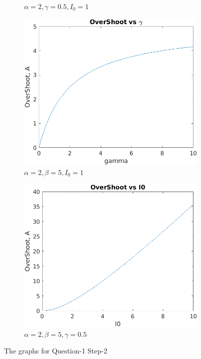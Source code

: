 \begin{figure}[h]
\begin{subfigure}[b]{0.4\textwidth}
         \caption{$\alpha = 2, \gamma = 0.5, I_0 = 1$}
         \label{fig:three sin x}
     \end{subfigure}
     \begin{subfigure}[b]{0.4\textwidth}
         \centering
         \includegraphics[width=\textwidth]{picture/Figure_1-2gama.png}
         \caption{$\alpha = 2, \beta = 5, I_0 = 1$}
         \label{fig:five over x}
     \end{subfigure}
    \begin{subfigure}[b]{0.4\textwidth}
         \centering
         \includegraphics[width=\textwidth]{picture/Figure_1-2I0.png}
         \caption{$\alpha = 2, \beta = 5, \gamma = 0.5$}
         \label{fig:five over x}
     \end{subfigure}
        \caption{The graphs for Question-1 Step-2}
        \label{fig:fourgraphsforq2}
\end{figure}
